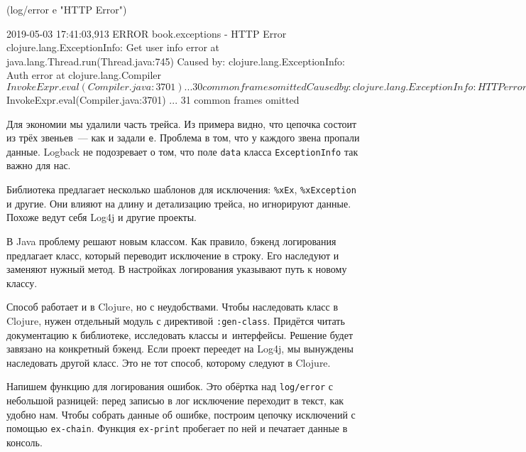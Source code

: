 \else

\begin{english}
  \begin{clojure}
(log/error e "HTTP Error")

2019-05-03 17:41:03,913 ERROR book.exceptions - HTTP Error
clojure.lang.ExceptionInfo: Get user info error
    at java.lang.Thread.run(Thread.java:745)
Caused by: clojure.lang.ExceptionInfo: Auth error
    at clojure.lang.Compiler$InvokeExpr.eval(Compiler.java:3701)
    ... 30 common frames omitted
Caused by: clojure.lang.ExceptionInfo: HTTP error
    at clojure.lang.Compiler$InvokeExpr.eval(Compiler.java:3701)
    ... 31 common frames omitted
  \end{clojure}
\end{english}

\fi

Для экономии мы удалили часть трейса. Из примера видно, что цепочка состоит из
трёх звеньев~--- как и задали \verb|e|. Проблема в том, что у каждого звена
пропали данные. Logback не подозревает о том, что поле \verb|data| класса
\verb|ExceptionInfo| так важно для нас.


Библиотека предлагает несколько шаблонов для исключения: \verb|%xEx|,
\verb|%xException| и другие. Они влияют на длину и детализацию трейса, но
игнорируют данные. Похоже ведут себя Log4j и другие проекты.

В Java проблему решают новым классом. Как правило, бэкенд логирования предлагает
класс, который переводит исключение в строку. Его наследуют и заменяют нужный
метод. В настройках логирования указывают путь к новому классу.

Способ работает и в Clojure, но с неудобствами. Чтобы наследовать класс в
Clojure, нужен отдельный модуль с директивой \verb|:gen-class|. Придётся
читать документацию к библиотеке, исследовать классы и~интерфейсы. Решение будет
завязано на конкретный бэкенд. Если проект переедет на Log4j, мы вынуждены
наследовать другой класс. Это не тот способ, которому следуют в Clojure.

Напишем функцию для логирования ошибок. Это обёртка над \verb|log/error| с
небольшой разницей: перед записью в лог исключение переходит в текст, как удобно
нам. Чтобы собрать данные об ошибке, построим цепочку исключений с помощью
\verb|ex-chain|. Функция \verb|ex-print| пробегает по ней и печатает данные в
консоль.


